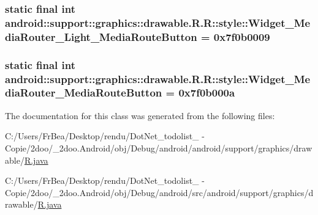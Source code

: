 \hypertarget{classandroid_1_1support_1_1graphics_1_1drawable_1_1_r_1_1style_09388477965ffe1fd64c4abeb2aed65a}{
\subsubsection[{Widget\_\-MediaRouter\_\-Light\_\-MediaRouteButton}]{\setlength{\rightskip}{0pt plus 5cm}static final int android::support::graphics::drawable.R.R::style::Widget\_\-MediaRouter\_\-Light\_\-MediaRouteButton = 0x7f0b0009}}
\label{classandroid_1_1support_1_1graphics_1_1drawable_1_1_r_1_1style_09388477965ffe1fd64c4abeb2aed65a}


\hypertarget{classandroid_1_1support_1_1graphics_1_1drawable_1_1_r_1_1style_941fd76e87f53eb2239ba7b068da1779}{
\subsubsection[{Widget\_\-MediaRouter\_\-MediaRouteButton}]{\setlength{\rightskip}{0pt plus 5cm}static final int android::support::graphics::drawable.R.R::style::Widget\_\-MediaRouter\_\-MediaRouteButton = 0x7f0b000a}}
\label{classandroid_1_1support_1_1graphics_1_1drawable_1_1_r_1_1style_941fd76e87f53eb2239ba7b068da1779}




The documentation for this class was generated from the following files:\begin{CompactItemize}
\item 
C:/Users/FrBea/Desktop/rendu/DotNet\_\-todolist\_ - Copie/2doo/\_\-2doo.Android/obj/Debug/android/android/support/graphics/drawable/\hyperlink{android_2support_2graphics_2drawable_2_r_8java}{R.java}\item 
C:/Users/FrBea/Desktop/rendu/DotNet\_\-todolist\_ - Copie/2doo/\_\-2doo.Android/obj/Debug/android/src/android/support/graphics/drawable/\hyperlink{src_2android_2support_2graphics_2drawable_2_r_8java}{R.java}\end{CompactItemize}
